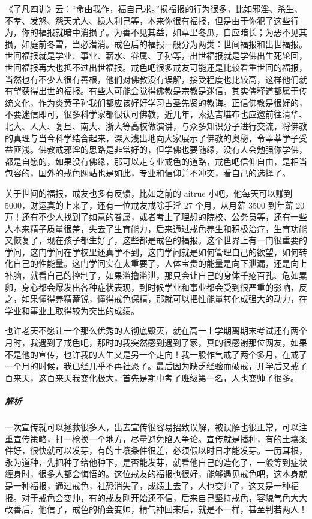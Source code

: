 《了凡四训》云：“命由我作，福自己求。”损福报的行为很多，比如邪淫、杀生、不孝、发怒、怨天尤人、损人利己等，本来你很有福报，但是由于你犯了这些行为，你的福报就暗中消损了。为善不见其益，如草里冬瓜，自应暗长；为恶不见其损，如庭前冬雪，当必潜消。戒色后的福报一般分为两类：世间福报和出世福报。世间福报就是学业、事业、薪水、眷属、子孙等，出世福报就是学佛出生死轮回，世间福报再大也抵不过出世福报。戒色吧很多戒友可能还是比较看重世间的福报，当然也有不少人很有善根，他们对佛教没有误解，接受程度也比较高，这样他们就有望获得出世的福报。有些人可能会觉得佛教是宗教是迷信，其实儒释道都属于传统文化，作为炎黄子孙我们都应该好好学习古圣先贤的教诲。正信佛教是很好的，不要迷信即可，很多科学家都很认可佛教，近几年，索达吉堪布也应邀前往清华、北大、人大、复旦、南大、浙大等高校做演讲，与众多知识分子进行交流，将佛教的真理与当今科学结合起来，深入浅出地向大家展示了佛教的奥秘，令莘莘学子受益匪浅。佛教戒邪淫的思路是非常好的，但学佛也要随缘，没有人会勉强你学佛，都是自愿的，如果没有佛缘，那可以走专业戒色的道路，戒色吧信仰自由，是相当包容的，国外的戒色网站也是如此，专业和信仰并不冲突，看自己的选择了。

关于世间的福报，戒友也多有反馈，比如之前的 aitrue 小吧，他每天可以赚到 5000，财运真的上来了，还有一位戒友戒除手淫 27 个月，从月薪 3500 到年薪 20 万！还有不少人找到了如意的眷属，或者考上了理想的院校、公务员等，还有一些人本来精子质量很差，失去了生育能力，后来通过戒色养生和积极治疗，生育功能又恢复了，现在孩子都生好了，这些都是戒色的福报。这个世界上有一门很重要的学问，这门学问在学校里还真学不到，这门学问就是如何管理自己的欲望，如何转化自己的性能量。这门学问实在太重要了，人体宝贵的能量是向下泄漏，还是向上补脑，就看自己的控制了，如果滥撸滥泄，那只会让自己的身体千疮百孔、危如累卵，身心都会爆发出各种症状表现，到时候学业和事业都会受到很严重的影响，反之，如果懂得养精蓄锐，懂得戒色保精，那就可以把性能量转化成强大的动力，在学业和事业上取得较为突出的成绩。

\begin{case}
    也许老天不愿让一个那么优秀的人彻底毁灭，就在高一上学期离期末考试还有两个月时，我遇到了戒色吧，那时的我突然感到遇到了家，真的很感谢那位网友，如果不是他的宣传，也许我的人生又是另一个走向！我一股作气戒了两个多月，在戒了一个月的时候，我已经几乎不再社恐了。最后因为缺乏经验而破戒，开学后又戒了百来天，这百来天我变化极大，首先是期中考了班级第一名，人也变帅了很多。
    \subparagraph{解析} 一次宣传就可以拯救很多人，出去宣传很容易招致误解，被误解也很正常，可以注重宣传策略，打一枪换一个地方，尽量避免陷入争论。宣传就是播种，有的土壤条件好，很快就可以发芽，有的土壤条件很差，必须假以时日才能发芽。一历耳根，永为道种，先把种子给他种下，是否能发芽，就看他自己的造化了，一般等到症状缠身时，很多人都会悔悟的。这位戒友的福报也很好，能够遇见戒色吧，这本身就是一种福报，通过戒色，社恐消失了，成绩上去了，人也变帅了，这又是一种福报。对于戒色会变帅，有的戒友刚开始还不信，后来自己坚持戒色，容貌气色大大改善后，他信了，戒色的确会变帅，精气神回来后，就是不一样，甚至判若两人！
\end{case}


